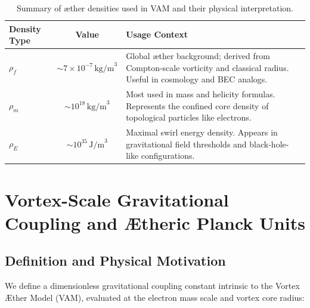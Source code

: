 \documentclass[preprint]{revtex4-2}
\begin{document}
                \vspace{0.3cm}
                \begin{table}[H]
                    \centering
                    \scriptsize
                    \begin{tabular}{|l|c|p{7.5cm}|}
                        \hline
                        \textbf{Density Type} & \textbf{Value} & \textbf{Usage Context} \\
                        \hline
                        \( \rho_{\scriptscriptstyle\boldsymbol\!f} \) & \( \sim 7 \times 10^{-7} \, \text{kg/m}^3 \) & Global æther background; derived from Compton-scale vorticity and classical radius. Useful in cosmology and BEC analogs. \\
                        \hline
                        \( \rho_{\scriptscriptstyle\boldsymbol\!m} \) & \( \sim 10^{18} \, \text{kg/m}^3 \) & Most used in mass and helicity formulas. Represents the confined core density of topological particles like electrons. \\
                        \hline
                        \( \rho_{\scriptscriptstyle\boldsymbol\!E} \) & \( \sim 10^{35} \, \text{J/m}^3 \) & Maximal swirl energy density. Appears in gravitational field thresholds and black-hole-like configurations. \\
                        \hline
                    \end{tabular}
                    \caption{Summary of æther densities used in VAM and their physical interpretation.}
                    \label{tab:aether_density_summary}
                \end{table}

       \section{Vortex-Scale Gravitational Coupling and Ætheric Planck Units}
                \subsection*{Definition and Physical Motivation}

                We define a dimensionless gravitational coupling constant intrinsic to the Vortex \AE{}ther Model (VAM), evaluated at the electron mass scale and vortex core radius:
\end{document}
